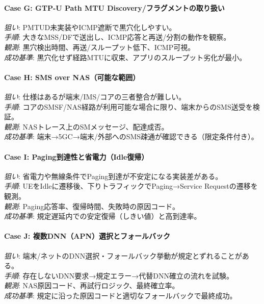\paragraph{Case G: GTP-U Path MTU Discovery/フラグメントの取り扱い}
\textit{狙い}: PMTUD未実装やICMP遮断で黒穴化しやすい。\\
\textit{手順}: 大きなMSS/DFで送出し、ICMP応答と再送/分割の動作を観察。\\
\textit{観測}: 黒穴検出時間、再送/スループット低下、ICMP可視。\\
\textit{成功基準}: 黒穴化せず経路MTUに収束、アプリのスループット劣化が最小。

\paragraph{Case H: SMS over NAS（可能な範囲）}
\textit{狙い}: 仕様はあるが端末/IMS/コアの三者整合が難しい。\\
\textit{手順}: コアのSMSF/NAS経路が利用可能な場合に限り、端末からのSMS送受を検証。\\
\textit{観測}: NASトレース上のSMメッセージ、配達成否。\\
\textit{成功基準}: 端末→5GC→端末/外部へのSMS疎通が確認できる（限定条件付き）。

\paragraph{Case I: Paging到達性と省電力（Idle復帰）}
\textit{狙い}: 省電力や無線条件でPaging到達が不安定になる実装差がある。\\
\textit{手順}: UEをIdleに遷移後、下りトラフィックでPaging→Service Requestの遷移を観測。\\
\textit{観測}: Paging応答率、復帰時間、失敗時の原因コード。\\
\textit{成功基準}: 規定遅延内での安定復帰（しきい値）と高到達率。

\paragraph{Case J: 複数DNN（APN）選択とフォールバック}
\textit{狙い}: 端末/ネットのDNN選択・フォールバック挙動が規定とずれることがある。\\
\textit{手順}: 存在しないDNN要求→規定エラー→代替DNN確立の流れを試験。\\
\textit{観測}: NAS原因コード、再試行ロジック、最終確立率。\\
\textit{成功基準}: 規定に沿った原因コードと適切なフォールバックで最終成功。

